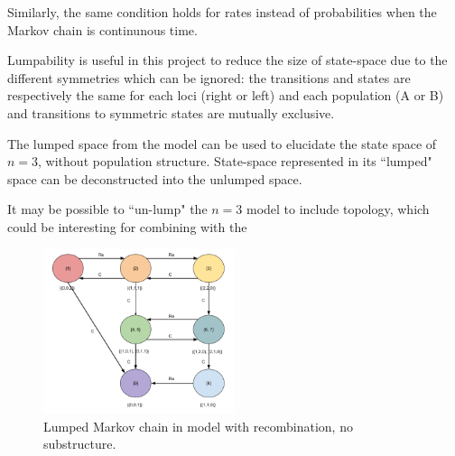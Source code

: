 \documentclass[11pt,oneside]{amsart}
\begin{document}
Similarly, the same condition holds for rates instead of probabilities when the Markov chain is continunous time.

Lumpability is useful in this project to reduce the size of state-space due to the different symmetries which can be ignored: the transitions and states are respectively the same for each loci (right or left) and each population (A or B) and transitions to symmetric states are mutually exclusive.

The lumped space from the \cite{SimonsenChurchill1997} model can be used to elucidate the state space of $n=3$, without population structure. State-space represented in its ``lumped" space can be deconstructed into the unlumped space. 

It may be possible to ``un-lump" the $n=3$ model to include topology, which could be interesting for combining with the \cite{SlatkinPollack2008}






\begin{figure}[ht]
\centering
\includegraphics[width=0.5\textwidth]{Lumped_recomb.png}
\caption{Lumped Markov chain in model with recombination, no substructure.}
\label{Figure: lumped recomb}
\end{figure}
\end{document}
